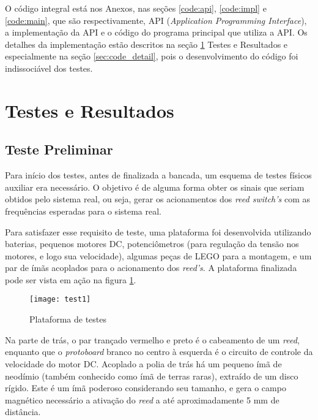 \documentclass[a4paper,11pt]{article}
\begin{document}
O código integral está nos Anexos, nas seções \ref{code:api}, \ref{code:impl} e
\ref{code:main}, que são respectivamente, API (\textit{Application Programming
Interface}), a implementação da API e o código do programa principal que
utiliza a API. Os detalhes da implementação estão descritos na seção
\ref{sec:resultados} Testes e Resultados e especialmente na seção
\ref{sec:code_detail}, pois o desenvolvimento do código foi indissociável dos
testes.

\pagebreak
%
\section{Testes e Resultados}
\label{sec:resultados}

\subsection{Teste Preliminar}

Para início dos testes, antes de finalizada a bancada, um esquema de testes
físicos auxiliar era necessário. O objetivo é de alguma forma obter os sinais
que seriam obtidos pelo sistema real, ou seja, gerar os acionamentos dos
\textit{reed switch's} com as frequências esperadas para o sistema real.

Para satisfazer esse requisito de teste, uma plataforma foi desenvolvida
utilizando baterias, pequenos motores DC, potenciômetros (para regulação da
tensão nos motores, e logo sua velocidade), algumas peças de
LEGO\textsuperscript{\textregistered} para a montagem, e um par de ímãs
acoplados para o acionamento dos \textit{reed's}. A plataforma finalizada pode
ser vista em ação na figura \ref{fig:test1}.

\begin{figure}[h!]
\begin{center}
 \texttt{[image: test1]}
\end{center}
  \caption{Plataforma de testes}
  \label{fig:test1}
\end{figure}

Na parte de trás, o par trançado vermelho e preto é o cabeamento de um
\textit{reed}, enquanto que o \textit{protoboard} branco no centro à esquerda é
o circuito de controle da velocidade do motor DC. Acoplado a polia de trás há
um pequeno ímã de neodímio (também conhecido como ímã de terras raras),
extraído de um disco rígido. Este é um ímã poderoso considerando seu tamanho, e
gera o campo magnético necessário a ativação do \textit{reed} a até
aproximadamente 5 mm de distância.
\end{document}
